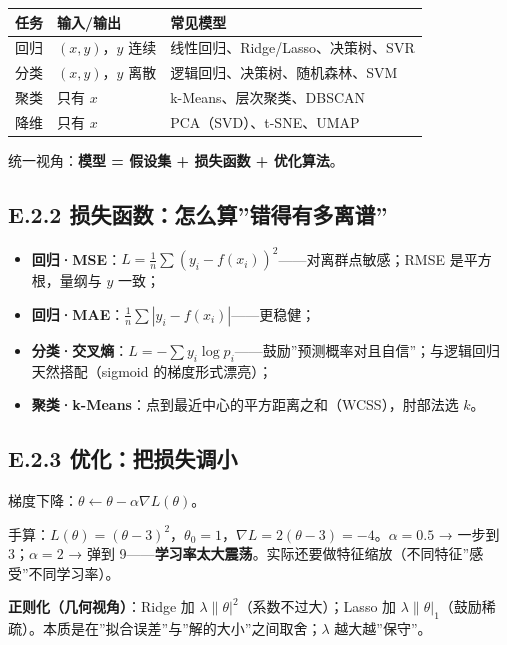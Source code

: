 {\def\LTcaptype{none} %
\begin{longtable}[]{@{}lll@{}}
\toprule\noalign{}
任务 & 输入/输出 & 常见模型 \\
\midrule\noalign{}
\endhead
\bottomrule\noalign{}
\endlastfoot
回归 & \((x,y)\)，\(y\) 连续 & 线性回归、Ridge/Lasso、决策树、SVR \\
分类 & \((x,y)\)，\(y\) 离散 & 逻辑回归、决策树、随机森林、SVM \\
聚类 & 只有 \(x\) & k-Means、层次聚类、DBSCAN \\
降维 & 只有 \(x\) & PCA（SVD）、t-SNE、UMAP \\
\end{longtable}
}

统一视角：\textbf{模型 = 假设集 + 损失函数 + 优化算法}。

\subsection{E.2.2
损失函数：怎么算''错得有多离谱''}\label{e.2.2-ux635fux5931ux51fdux6570ux600eux4e48ux7b97ux9519ux5f97ux6709ux591aux79bbux8c31}

\begin{itemize}
\tightlist
\item
  \textbf{回归·MSE}：\(L=\frac{1}{n}\sum(y_i-f(x_i))^2\)------对离群点敏感；RMSE
  是平方根，量纲与 \(y\) 一致；
\item
  \textbf{回归·MAE}：\(\frac{1}{n}\sum|y_i-f(x_i)|\)------更稳健；
\item
  \textbf{分类·交叉熵}：\(L=-\sum y_i\log p_i\)------鼓励''预测概率对且自信''；与逻辑回归天然搭配（sigmoid
  的梯度形式漂亮）；
\item
  \textbf{聚类·k-Means}：点到最近中心的平方距离之和（WCSS），肘部法选
  \(k\)。
\end{itemize}

\subsection{E.2.3
优化：把损失调小}\label{e.2.3-ux4f18ux5316ux628aux635fux5931ux8c03ux5c0f}

梯度下降：\(\theta\gets\theta-\alpha\nabla L(\theta)\)。

手算：\(L(\theta)=(\theta-3)^2\)，\(\theta_0=1\)，\(\nabla L=2(\theta-3)=-4\)。\(\alpha=0.5\)
→ 一步到 3；\(\alpha=2\) → 弹到
9------\textbf{学习率太大震荡}。实际还要做特征缩放（不同特征''感受''不同学习率）。

\textbf{正则化（几何视角）}：Ridge 加
\(\lambda\|\theta|^2\)（系数不过大）；Lasso 加
\(\lambda\|\theta|_1\)（鼓励稀疏）。本质是在''拟合误差''与''解的大小''之间取舍；\(\lambda\)
越大越''保守''。

